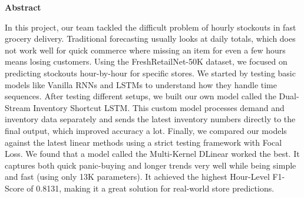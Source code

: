 \documentclass[12pt,phd,times]{pkmthesis}
\begin{document}
\setcounter{page}{1}   %
\onehalfspacing                              %
%

\thispagestyle{empty}

\thispagestyle{empty}

\clearpage
\thispagestyle{empty}
%
\newpage
\thispagestyle{empty}
\clearpage
\thispagestyle{empty}

\newpage
\thispagestyle{empty}
\clearpage

\thispagestyle{empty}

\thispagestyle{empty}
\clearpage

\thispagestyle{empty}
%
{\renewcommand{\baselinestretch}{1.5}
{%
\begin{center}
	{\bf{Abstract}}
\end{center}
{\em{\noindent 
In this project, our team tackled the difficult problem of hourly stockouts in fast grocery delivery. Traditional forecasting usually looks at daily totals, which does not work well for quick commerce where missing an item for even a few hours means losing customers. Using the FreshRetailNet-50K dataset, we focused on predicting stockouts hour-by-hour for specific stores. We started by testing basic models like Vanilla RNNs and LSTMs to understand how they handle time sequences. After testing different setups, we built our own model called the Dual-Stream Inventory Shortcut LSTM. This custom model processes demand and inventory data separately and sends the latest inventory numbers directly to the final output, which improved accuracy a lot. Finally, we compared our models against the latest linear methods using a strict testing framework with Focal Loss. We found that a model called the Multi-Kernel DLinear worked the best. It captures both quick panic-buying and longer trends very well while being simple and fast (using only 13K parameters). It achieved the highest Hour-Level F1-Score of 0.8131, making it a great solution for real-world store predictions.

	}}}}	
\thispagestyle{empty}
\clearpage
\end{document}
